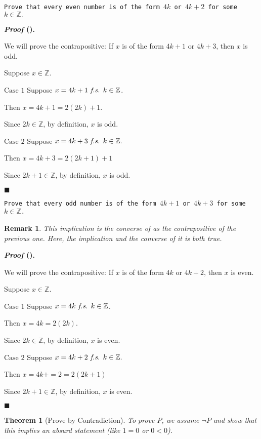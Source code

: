 \documentclass[12pt,a4paper]{article}
\newtheorem{thm}{Theorem}[subsection]
\newcounter{nprf}[subsection]
\newtheorem*{rmk}{\indent Remark}
\newenvironment*{prf}{\par\indent\textbf{\textit{Proof} (\stepcounter{nprf}\thenprf). }\par }{\par\hfill $\blacksquare$\par}
\def\Z{{\mathbb{Z}}}
\def\fs{\emph{ f.s. }}
\begin{document}
\begin{framed}
\noindent\texttt{Prove that every even number is of the form $4k$ or $4k+2$ for some $k\in\Z.$}
\begin{prf}
	We will prove the contrapositive: If $x$ is of the form $4k+1$ or $4k+3$, then $x$ is odd. \par Suppose $x\in\Z$.\par $\boxed{\text{Case }1}$ Suppose $x=4k+1\fs k\in\Z$. \par\hspace{5mm}Then $x=4k+1=2(2k)+1$.\par\hspace{5mm}Since $2k\in\Z$, by definition, $x$ is odd. \par $\boxed{\text{Case }2}$ Suppose $x=4k+3\fs k\in\Z.$\par\hspace{5mm}Then $x=4k+3=2(2k+1)+1$\par\hspace{5mm}Since $2k+1\in\Z$, by definition, $x$ is odd. 
\end{prf}
\end{framed}
\begin{framed}
\noindent\texttt{Prove that every odd number is of the form $4k+1$ or $4k+3$ for some $k\in\Z$.}
\begin{rmk}	This implication is the converse of  as the contrapositive of the previous one. Here, the implication and the converse of it is both true.\end{rmk}
\begin{prf}
	We will prove the contrapositive: If $x$ is of the form $4k$ or $4k+2$, then $x$ is even.\par Suppose $x\in\Z.$ \par $\boxed{\text{Case }1}$ Suppose $x=4k\fs k\in\Z$. \par\hspace{5mm}Then $x=4k=2(2k)$.\par\hspace{5mm}Since $2k\in\Z$, by definition, $x$ is even. \par $\boxed{\text{Case }2}$ Suppose $x=4k+2\fs k\in\Z.$\par\hspace{5mm}Then $x=4k+=2=2(2k+1)$\par\hspace{5mm}Since $2k+1\in\Z$, by definition, $x$ is even. 
\end{prf}
\end{framed}
\begin{thm}[Prove by Contradiction]
	To prove $P$, we assume $\neg P$ and show that this implies an absurd statement (like $1=0$ or $0<0$).
\end{thm}
\end{document}
